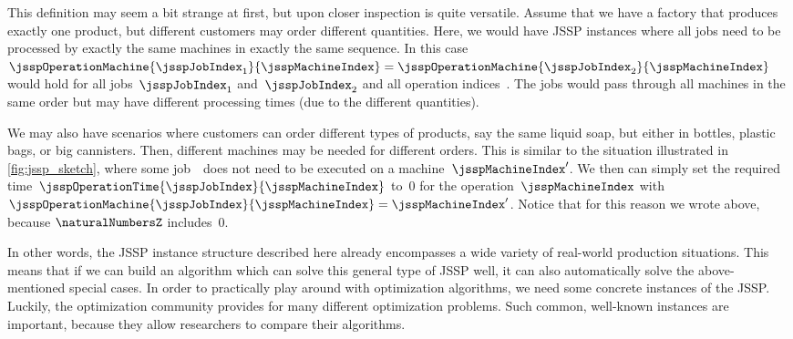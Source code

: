 This definition may seem a bit strange at first, but upon closer inspection is quite versatile.
Assume that we have a factory that produces exactly one product, but different customers may order different quantities.
Here, we would have JSSP instances where all jobs need to be processed by exactly the same machines in exactly the same sequence.
In this case~$\jsspOperationMachine{\jsspJobIndex_1}{\jsspMachineIndex}=\jsspOperationMachine{\jsspJobIndex_2}{\jsspMachineIndex}$ would hold for all jobs~$\jsspJobIndex_1$ and~$\jsspJobIndex_2$ and all operation indices~\jsspMachineIndex.
The jobs would pass through all machines in the same order but may have different processing times (due to the different quantities).

We may also have scenarios where customers can order different types of products, say the same liquid soap, but either in bottles, plastic bags, or big cannisters.
Then, different machines may be needed for different orders.
This is similar to the situation illustrated in \autoref{fig:jssp_sketch}, where some job~\jsspJobIndex\ does not need to be executed on a machine~$\jsspMachineIndex'$.
We then can simply set the required time~$\jsspOperationTime{\jsspJobIndex}{\jsspMachineIndex}$ to~0 for the operation~$\jsspMachineIndex$ with~$\jsspOperationMachine{\jsspJobIndex}{\jsspMachineIndex}=\jsspMachineIndex'$.
Notice that for this reason we wrote \inQuotes{$\jsspOperationTime{\jsspJobIndex}{\jsspMachineIndex}\in\naturalNumbersZ$} above, because $\naturalNumbersZ$ includes~0.

In other words, the JSSP instance structure described here already encompasses a wide variety of real-world production situations.
This means that if we can build an algorithm which can solve this general type of JSSP well, it can also automatically solve the above-mentioned special cases.
\endhsection%
%
%
\label{sec:jsspBenchmarkInstances}%
In order to practically play around with optimization algorithms, we need some concrete instances of the JSSP.
Luckily, the optimization community provides  for many different optimization problems.
Such common, well-known instances are important, because they allow researchers to compare their algorithms.

